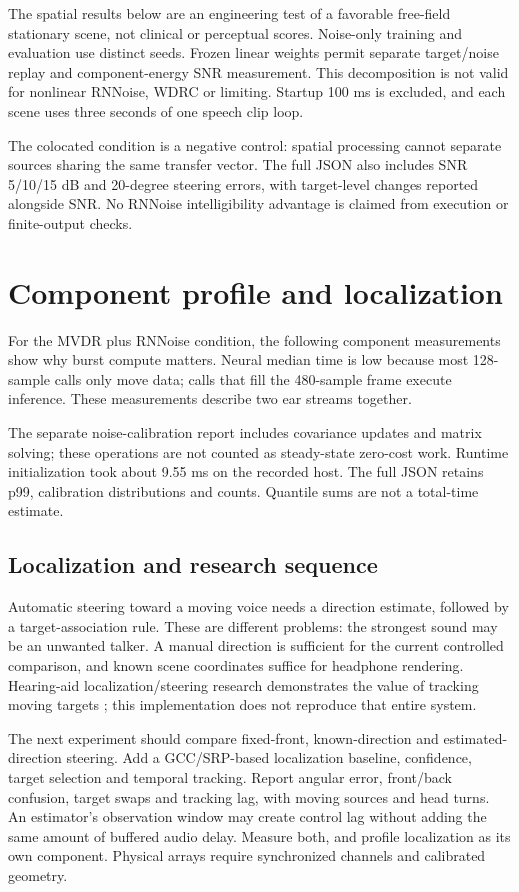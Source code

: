 \documentclass[11pt,a4paper]{article}
\begin{document}
The spatial results below are an engineering test of a favorable free-field stationary scene, not clinical or perceptual scores. Noise-only training and evaluation use distinct seeds. Frozen linear weights permit separate target/noise replay and component-energy SNR measurement. This decomposition is not valid for nonlinear RNNoise, WDRC or limiting. Startup 100 ms is excluded, and each scene uses three seconds of one speech clip loop.



The colocated condition is a negative control: spatial processing cannot separate sources sharing the same transfer vector. The full JSON also includes SNR 5/10/15 dB and 20-degree steering errors, with target-level changes reported alongside SNR. No RNNoise intelligibility advantage is claimed from execution or finite-output checks.

\newpage
\normalsize
\section{Component profile and localization}
For the MVDR plus RNNoise condition, the following component measurements show why burst compute matters. Neural median time is low because most 128-sample calls only move data; calls that fill the 480-sample frame execute inference. These measurements describe two ear streams together.

The separate noise-calibration report includes covariance updates and matrix solving; these operations are not counted as steady-state zero-cost work. Runtime initialization took about 9.55 ms on the recorded host. The full JSON retains p99, calibration distributions and counts. Quantile sums are not a total-time estimate.

\subsection{Localization and research sequence}
Automatic steering toward a moving voice needs a direction estimate, followed by a target-association rule. These are different problems: the strongest sound may be an unwanted talker. A manual direction is sufficient for the current controlled comparison, and known scene coordinates suffice for headphone rendering. Hearing-aid localization/steering research demonstrates the value of tracking moving targets \cite{adiloglu}; this implementation does not reproduce that entire system.

The next experiment should compare fixed-front, known-direction and estimated-direction steering. Add a GCC/SRP-based localization baseline, confidence, target selection and temporal tracking. Report angular error, front/back confusion, target swaps and tracking lag, with moving sources and head turns. An estimator's observation window may create control lag without adding the same amount of buffered audio delay. Measure both, and profile localization as its own component. Physical arrays require synchronized channels and calibrated geometry.
\end{document}
